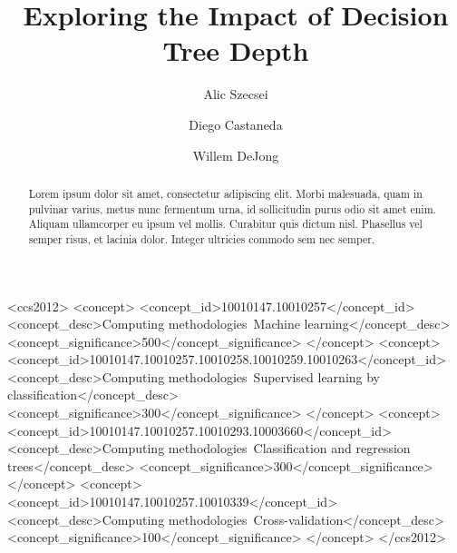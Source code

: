 \documentclass[screen, authorversion, nonacm, sigconf]{acmart}
\begin{document}
\title{Exploring the Impact of Decision Tree Depth}

\author{Alic Szecsei}

\author{Diego Castaneda}

\author{Willem DeJong}

\begin{abstract}
  Lorem ipsum dolor sit amet, consectetur adipiscing elit. Morbi malesuada, quam in pulvinar varius, metus nunc fermentum urna, id sollicitudin purus odio sit amet enim. Aliquam ullamcorper eu ipsum vel mollis. Curabitur quis dictum nisl. Phasellus vel semper risus, et lacinia dolor. Integer ultricies commodo sem nec semper.
\end{abstract}

\begin{CCSXML}
  <ccs2012>
  <concept>
  <concept_id>10010147.10010257</concept_id>
  <concept_desc>Computing methodologies~Machine learning</concept_desc>
  <concept_significance>500</concept_significance>
  </concept>
  <concept>
  <concept_id>10010147.10010257.10010258.10010259.10010263</concept_id>
  <concept_desc>Computing methodologies~Supervised learning by classification</concept_desc>
  <concept_significance>300</concept_significance>
  </concept>
  <concept>
  <concept_id>10010147.10010257.10010293.10003660</concept_id>
  <concept_desc>Computing methodologies~Classification and regression trees</concept_desc>
  <concept_significance>300</concept_significance>
  </concept>
  <concept>
  <concept_id>10010147.10010257.10010339</concept_id>
  <concept_desc>Computing methodologies~Cross-validation</concept_desc>
  <concept_significance>100</concept_significance>
  </concept>
  </ccs2012>
\end{CCSXML}



\maketitle
\end{document}
